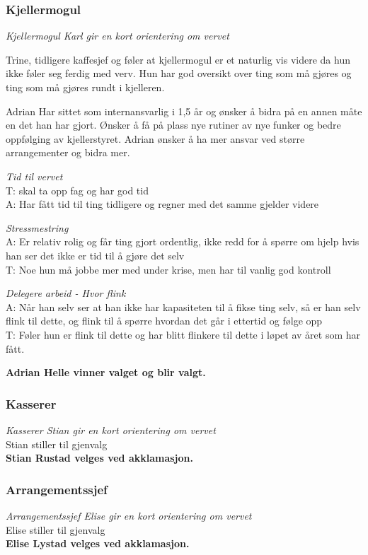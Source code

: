 \documentclass[10pt,norsk,a4paper]{article}
\begin{document}
\begin{multicols}{2}
\subsubsection{Kjellermogul}
\textit{Kjellermogul Karl gir en kort orientering om vervet}

Trine, tidligere kaffesjef og føler at kjellermogul er et naturlig vis
videre da hun ikke føler seg ferdig med verv. Hun har god oversikt over ting
som må gjøres og ting som må gjøres rundt i kjelleren.

Adrian Har sittet som internansvarlig i 1,5 år og ønsker å bidra på en
annen måte en det han har gjort. Ønsker å få på plass nye rutiner av nye
funker og bedre oppfølging av kjellerstyret. Adrian ønsker å ha mer ansvar ved
større arrangementer og bidra mer.

\textit{Tid til vervet}\\
T: skal ta opp fag og har god tid\\
A: Har fått tid til ting tidligere og regner med det samme gjelder videre

\textit{Stressmestring}\\
A: Er relativ rolig og får ting gjort ordentlig, ikke redd for å spørre om
hjelp hvis han ser det ikke er tid til å gjøre det selv\\
T: Noe hun må jobbe mer med under krise, men har til vanlig god kontroll

\textit{Delegere arbeid - Hvor flink}\\
A: Når han selv ser at han ikke har kapasiteten til å fikse ting selv, så er
han selv flink til dette, og flink til å spørre hvordan det går i ettertid og
følge opp\\
T: Føler hun er flink til dette og har blitt flinkere til dette i løpet av
året som har fått.

\textbf{Adrian Helle vinner valget og blir valgt.}

\subsubsection{Kasserer}
\textit{Kasserer Stian gir en kort orientering om vervet}\\
Stian stiller til gjenvalg\\
\textbf{Stian Rustad velges ved akklamasjon.}
\subsubsection{Arrangementssjef}
\textit{Arrangementssjef Elise gir en kort orientering om vervet}\\
Elise stiller til gjenvalg\\
\textbf{Elise Lystad velges ved akklamasjon.}

\end{multicols}
\end{document}
